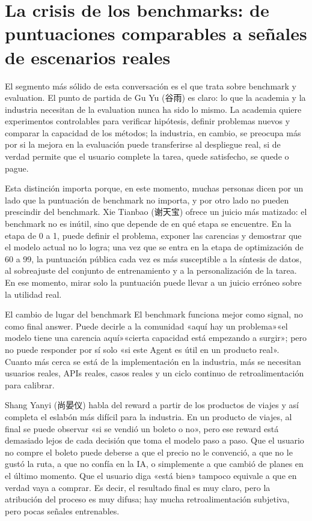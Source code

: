 \section{La crisis de los benchmarks: de puntuaciones comparables a señales de escenarios reales}

El segmento más sólido de esta conversación es el que trata sobre benchmark y evaluation. El punto de partida de Gu Yu (谷雨) es claro: lo que la academia y la industria necesitan de la evaluation nunca ha sido lo mismo. La academia quiere experimentos controlables para verificar hipótesis, definir problemas nuevos y comparar la capacidad de los métodos; la industria, en cambio, se preocupa más por si la mejora en la evaluación puede transferirse al despliegue real, si de verdad permite que el usuario complete la tarea, quede satisfecho, se quede o pague.

Esta distinción importa porque, en este momento, muchas personas dicen por un lado que la puntuación de benchmark no importa, y por otro lado no pueden prescindir del benchmark. Xie Tianbao (谢天宝) ofrece un juicio más matizado: el benchmark no es inútil, sino que depende de en qué etapa se encuentre. En la etapa de 0 a 1, puede definir el problema, exponer las carencias y demostrar que el modelo actual no lo logra; una vez que se entra en la etapa de optimización de 60 a 99, la puntuación pública cada vez es más susceptible a la síntesis de datos, al sobreajuste del conjunto de entrenamiento y a la personalización de la tarea. En ese momento, mirar solo la puntuación puede llevar a un juicio erróneo sobre la utilidad real.

\begin{importantbox}{El cambio de lugar del benchmark}
El benchmark funciona mejor como signal, no como final answer. Puede decirle a la comunidad «aquí hay un problema»«el modelo tiene una carencia aquí»«cierta capacidad está empezando a surgir»; pero no puede responder por sí solo «si este Agent es útil en un producto real». Cuanto más cerca se está de la implementación en la industria, más se necesitan usuarios reales, APIs reales, casos reales y un ciclo continuo de retroalimentación para calibrar.
\end{importantbox}

Shang Yanyi (尚晏仪) habla del reward a partir de los productos de viajes y así completa el eslabón más difícil para la industria. En un producto de viajes, al final se puede observar «si se vendió un boleto o no», pero ese reward está demasiado lejos de cada decisión que toma el modelo paso a paso. Que el usuario no compre el boleto puede deberse a que el precio no le convenció, a que no le gustó la ruta, a que no confía en la IA, o simplemente a que cambió de planes en el último momento. Que el usuario diga «está bien» tampoco equivale a que en verdad vaya a comprar. Es decir, el resultado final es muy claro, pero la atribución del proceso es muy difusa; hay mucha retroalimentación subjetiva, pero pocas señales entrenables.

